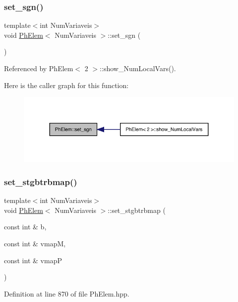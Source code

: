 \subsubsection{\texorpdfstring{set\+\_\+sgn()}{set\_sgn()}}
{\footnotesize\ttfamily template$<$int Num\+Variaveis$>$ \\
void \hyperlink{classPhElem}{Ph\+Elem}$<$ Num\+Variaveis $>$\+::set\+\_\+sgn (\begin{DoxyParamCaption}{ }\end{DoxyParamCaption})}



Referenced by Ph\+Elem$<$ 2 $>$\+::show\+\_\+\+Num\+Local\+Vars().

Here is the caller graph for this function\+:
\nopagebreak
\begin{figure}[H]
\begin{center}
\leavevmode
\includegraphics[width=324pt]{classPhElem_a03505c861fbcdb7cf8faec9fe5eea088_icgraph}
\end{center}
\end{figure}
\mbox{\label{classPhElem_ae63196241e8f39617acb1984cb06910e}} 
\subsubsection{\texorpdfstring{set\+\_\+stgbtrbmap()}{set\_stgbtrbmap()}}
{\footnotesize\ttfamily template$<$int Num\+Variaveis$>$ \\
void \hyperlink{classPhElem}{Ph\+Elem}$<$ Num\+Variaveis $>$\+::set\+\_\+stgbtrbmap (\begin{DoxyParamCaption}\item[{const int \&}]{b,  }\item[{const int \&}]{vmapM,  }\item[{const int \&}]{vmapP }\end{DoxyParamCaption})}



Definition at line 870 of file Ph\+Elem.\+hpp.



